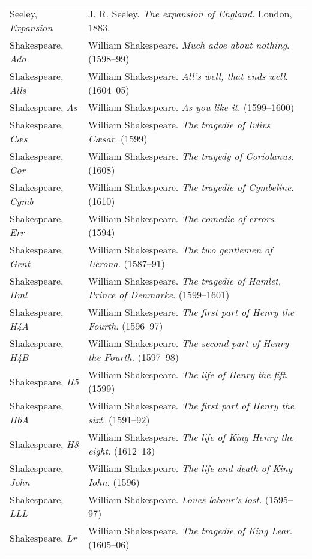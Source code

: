 \begin{longtable}{p{} p{}}
Seeley, \textit{Expansion} & J. R. Seeley. \textit{The expansion of England}. London, 1883. \\

Shakespeare, \textit{Ado} & William Shakespeare. \textit{Much adoe about nothing}. (1598--99) \\
Shakespeare, \textit{Alls} & William Shakespeare. \textit{All's well, that ends well}. (1604--05) \\
Shakespeare, \textit{As} & William Shakespeare. \textit{As you like it}. (1599--1600) \\
Shakespeare, \textit{Cæs} & William Shakespeare. \textit{The tragedie of Ivlivs Cæsar}. (1599) \\
Shakespeare, \textit{Cor} & William Shakespeare. \textit{The tragedy of Coriolanus}. (1608) \\
Shakespeare, \textit{Cymb} & William Shakespeare. \textit{The tragedie of Cymbeline}. (1610) \\
Shakespeare, \textit{Err} & William Shakespeare. \textit{The comedie of errors}. (1594) \\
Shakespeare, \textit{Gent} & William Shakespeare. \textit{The two gentlemen of Uerona}. (1587--91) \\
Shakespeare, \textit{Hml} & William Shakespeare. \textit{The tragedie of Hamlet, Prince of Denmarke}. (1599--1601) \\
Shakespeare, \textit{H4A} & William Shakespeare. \textit{The first part of Henry the Fourth}. (1596--97) \\
Shakespeare, \textit{H4B} & William Shakespeare. \textit{The second part of Henry the Fourth}. (1597--98) \\
Shakespeare, \textit{H5} & William Shakespeare. \textit{The life of Henry the fift}. (1599) \\ %
Shakespeare, \textit{H6A} & William Shakespeare. \textit{The first part of Henry the sixt}. (1591--92) \\ %
Shakespeare, \textit{H8} & William Shakespeare. \textit{The life of King Henry the eight}. (1612--13) \\ %
Shakespeare, \textit{John} & William Shakespeare. \textit{The life and death of King Iohn}.  (1596) \\
Shakespeare, \textit{LLL} & William Shakespeare. \textit{Loues labour's lost}. (1595--97) \\
Shakespeare, \textit{Lr} & William Shakespeare. \textit{The tragedie of King Lear}. (1605--06) \\

\end{longtable}
